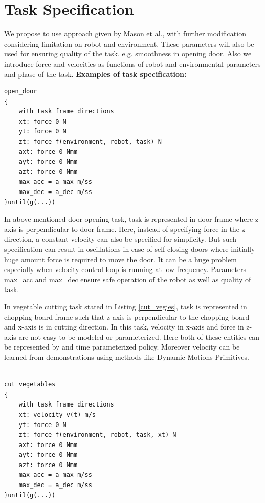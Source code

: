 \documentclass[thesis]{mas_proposal}
\begin{document}
\section{Task Specification}
We propose to use approach given by Mason et al.\cite{mason1981compliance}, with further modification considering limitation on robot and environment. These parameters will also be used for ensuring quality of the task. e.g. smoothness in opening door. Also we introduce force and velocities as functions of robot and environmental parameters and phase of the task. 
\newpage
\textbf{Examples of task specification:} 
\begin{lstlisting}[label=open_door_ts,caption=Task specification for opening door]
open_door
{
	with task frame directions
	xt: force 0 N
	yt: force 0 N
	zt: force f(environment, robot, task) N
	axt: force 0 Nmm
	ayt: force 0 Nmm
	azt: force 0 Nmm
	max_acc = a_max m/ss
	max_dec = a_dec m/ss
}until(g(...))

\end{lstlisting}

In above mentioned door opening task, task is represented in door frame where z-axis is perpendicular to door frame. Here, instead of specifying force in the z-direction, a constant velocity can also be specified for simplicity. But such specification can result in oscillations in case of self closing doors where initially huge amount force is required to move the door. It can be a huge problem especially when velocity control loop is running at low frequency. Parameters max\_acc and max\_dec ensure safe operation of the robot as well as quality of task.


In vegetable cutting task stated in Listing \ref{cut_vegies}, task is represented in chopping board frame such that z-axis is perpendicular to the chopping board and x-axis is in cutting direction. In this task, velocity in x-axis and force in z-axis are not easy to be modeled or parameterized. Here both of these entities can be represented by and time parameterized policy. Moreover velocity can be learned from demonstrations using methods like Dynamic Motions Primitives\cite{lioutikov2016learning}. 

\newpage
\begin{lstlisting}[label=cut_vegies,caption=Task specification for cutting vegetables]

cut_vegetables
{
	with task frame directions
	xt: velocity v(t) m/s
	yt: force 0 N
	zt: force f(environment, robot, task, xt) N
	axt: force 0 Nmm
	ayt: force 0 Nmm
	azt: force 0 Nmm
	max_acc = a_max m/ss
	max_dec = a_dec m/ss
}until(g(...))

\end{lstlisting}
\end{document}
